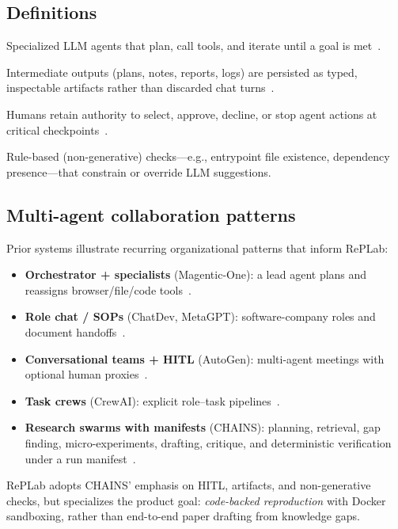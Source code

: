 \documentclass[11pt,a4paper]{article}
\begin{document}
\subsection{Definitions}
\begin{description}[style=nextline,leftmargin=1.2cm,itemsep=2pt]
  \item[Agentic AI]
    Specialized LLM agents that plan, call tools, and iterate until a goal is
    met~\cite{react}.
  \item[Artifact-driven workflow]
    Intermediate outputs (plans, notes, reports, logs) are persisted as typed,
    inspectable artifacts rather than discarded chat turns~\cite{metagpt,chains2026}.
  \item[Human-in-the-Loop (HITL)]
    Humans retain authority to select, approve, decline, or stop agent actions
    at critical checkpoints~\cite{autogen,chains2026}.
  \item[Deterministic verification]
    Rule-based (non-generative) checks---e.g., entrypoint file existence,
    dependency presence---that constrain or override LLM suggestions.
\end{description}

\subsection{Multi-agent collaboration patterns}
Prior systems illustrate recurring organizational patterns that inform RePLab:
\begin{itemize}[leftmargin=*,itemsep=2pt]
  \item \textbf{Orchestrator + specialists} (Magentic-One): a lead agent plans
        and reassigns browser/file/code tools~\cite{magenticone}.
  \item \textbf{Role chat / SOPs} (ChatDev, MetaGPT): software-company roles
        and document handoffs~\cite{chatdev,metagpt}.
  \item \textbf{Conversational teams + HITL} (AutoGen): multi-agent meetings
        with optional human proxies~\cite{autogen}.
  \item \textbf{Task crews} (CrewAI): explicit role--task pipelines~\cite{crewai}.
  \item \textbf{Research swarms with manifests} (CHAINS): planning, retrieval,
        gap finding, micro-experiments, drafting, critique, and deterministic
        verification under a run manifest~\cite{chains2026}.
\end{itemize}
RePLab adopts CHAINS' emphasis on HITL, artifacts, and non-generative checks,
but specializes the product goal: \emph{code-backed reproduction} with Docker
sandboxing, rather than end-to-end paper drafting from knowledge gaps.
\end{document}
